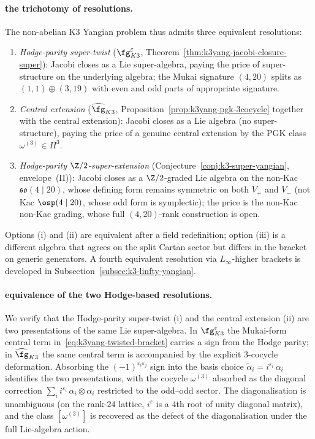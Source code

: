 \paragraph{the trichotomy of resolutions.}
The non-abelian K3 Yangian problem thus admits three equivalent
resolutions:
\begin{enumerate}[label=\textup{(\roman*)}]
\item \emph{Hodge-parity super-twist} ($\fg^{\varepsilon}_{K3}$,
 Theorem~\ref{thm:k3yang-jacobi-closure-super}): Jacobi closes as
 a Lie super-algebra, paying the price of super-structure on the
 underlying algebra; the Mukai signature $(4, 20)$ splits as
 $(1, 1) \oplus (3, 19)$ with even and odd parts of appropriate
 signature.
\item \emph{Central extension} ($\widehat{\fg}_{K3}$,
 Proposition~\ref{prop:k3yang-pgk-3cocycle} together with the central extension):
 Jacobi closes as a Lie algebra (no super-structure), paying the
 price of a genuine central extension by the PGK class
 $\omega^{(3)} \in H^3$.
\item \emph{Hodge-parity $\Z/2$-super-extension}
 (Conjecture~\ref{conj:k3-super-yangian}, envelope~(II)): Jacobi
 closes as a $\Z/2$-graded Lie algebra on the non-Kac
 $\mathfrak{so}(4 \mid 20)$, whose defining form remains symmetric
 on both $V_+$ and $V_-$ (not Kac $\osp(4 \mid 20)$, whose odd form
 is symplectic); the price is the non-Kac non-Kac
 grading, whose full $(4, 20)$-rank construction is open.
\end{enumerate}
Options (i) and (ii) are equivalent after a field redefinition;
option (iii) is a different algebra that agrees on the split
Cartan sector but differs in the bracket on generic generators.
A fourth equivalent resolution via $L_\infty$-higher brackets
is developed in Subsection~\ref{subsec:k3-linfty-yangian}.

\paragraph{equivalence of the two Hodge-based resolutions.}
We verify that the Hodge-parity super-twist (i) and the central
extension (ii) are two presentations of the same Lie super-algebra.
In $\fg^{\varepsilon}_{K3}$ the Mukai-form central term
in~\eqref{eq:k3yang-twisted-bracket} carries a sign from the Hodge
parity; in $\widehat{\fg}_{K3}$ the same central term is
accompanied by the explicit $3$-cocycle deformation. Absorbing the
$(-1)^{\varepsilon_i \varepsilon_j}$ sign into the basis choice
$\widetilde{\alpha}_i = i^{\varepsilon_i}\, \alpha_i$ identifies
the two presentations, with the cocycle $\omega^{(3)}$ absorbed as
the diagonal correction
$\sum_i i^{\varepsilon_i}\, \alpha_i \otimes \alpha_i$ restricted
to the odd--odd sector. The diagonalisation is unambiguous (on the
rank-$24$ lattice, $i^{\varepsilon}$ is a $4$th root of unity
diagonal matrix), and the class $[\omega^{(3)}]$ is recovered as
the defect of the diagonalisation under the full Lie-algebra
action.

